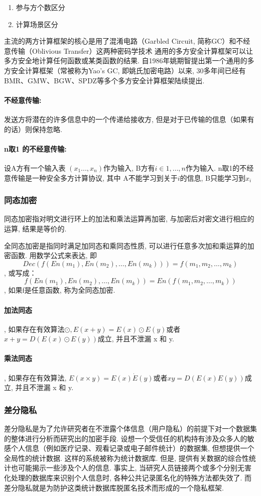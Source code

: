 \begin{enumerate}
    \item 参与方个数区分
    \item 计算场景区分
\end{enumerate}

主流的两方计算框架的核心是用了混淆电路（Garbled Circuit, 简称GC）和不经意传输（Oblivious Transfer）这两种密码学技术
通用的多方安全计算框架可以让多方安全地计算任何函数或某类函数的结果. 自1986年姚期智提出第一个通用的多方安全计算框架（常被称为Yao’s GC, 即姚氏加密电路）以来, 30多年间已经有BMR、GMW、BGW、SPDZ等多个多方安全计算框架陆续提出. 
\citep{GenExchsecretyao1986}
\paragraph{不经意传输:}
发送方将潜在的许多信息中的一个传递给接收方, 但是对于已传输的信息（如果有的话）则保持忽略. 


\paragraph{n取1 的不经意传输:}设A方有一个输入表 $(x_1..., x_n)$作为输入, 
B方有$i \in 1,  \dots , n$作为输入. n取1的不经意传输是一种安全多方计算协议, 其中
A不能学习到关于$i$的信息, B只能学习到$x_i$
\subsubsection{同态加密}
同态加密指对明文进行环上的加法和乘法运算再加密, 与加密后对密文进行相应的运算, 结果是等价的. 

全同态加密是指同时满足加同态和乘同态性质, 可以进行任意多次加和乘运算的加密函数. 用数学公式来表达, 即$$Dec(f(En(m_1), En(m_2), …, En(m_k)))=f(m_1, m_2, …, m_k)$$, 或写成：$$f(En(m_1), En(m_2), …, En(m_k))=En(f(m_1, m_2, …, m_k))$$, 如果f是任意函数, 称为全同态加密. 
\paragraph{加法同态}, 如果存在有效算法$\odot$$, E(x+y)=E(x)\odot E(y)$或者$ x+y=D(E(x)\odot E(y))$成立, 并且不泄漏 x 和 y. 
\paragraph{乘法同态}, 如果存在有效算法, $E(x \times y)=E(x) \dot E(y)$或者$ xy=D(E(x) E(y))$成立, 并且不泄漏 x 和 y. 



\subsubsection{差分隐私} 
差分隐私是为了允许研究者在不泄露个体信息（用户隐私）的前提下对一个数据集的整体进行分析而研究出的加密手段. \cite{DPDwork2008}
设想一个受信任的机构持有涉及众多人的敏感个人信息（例如医疗记录、观看记录或电子邮件统计）的数据集, 但想提供一个全局性的统计数据. 这样的系统被称为统计数据库. 但是, 提供有关数据的综合性统计也可能揭示一些涉及个人的信息. 事实上, 当研究人员链接两个或多个分别无害化处理的数据库来识别个人信息时, 各种公共记录匿名化的特殊方法都失效了. 而差分隐私就是为防护这类统计数据库脱匿名技术而形成的一个隐私框架. 


